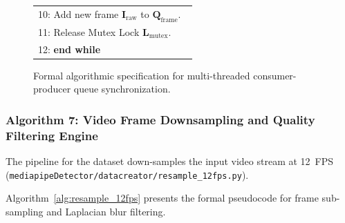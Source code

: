 \begin{figure}[htbp]
\begin{minipage}{0.92\textwidth}
\begin{tabular}{|p{0.96\linewidth}|}
{\small 10: \hspace{1em} Add new frame $\mathbf{I}_{\text{raw}}$ to $\mathbf{Q}_{\text{frame}}$.} \\
{\small 11: \hspace{1em} Release Mutex Lock $\mathbf{L}_{\text{mutex}}$.} \\
{\small 12: \textbf{end while}} \\
\hline
\end{tabular}
\end{minipage}
\caption{Formal algorithmic specification for multi-threaded consumer-producer queue synchronization.}
\label{alg:queue_synchronization}
\end{figure}

\subsubsection{Algorithm 7: Video Frame Downsampling and Quality Filtering Engine}
The pipeline for the dataset down-samples the input video stream at 12~FPS (\texttt{mediapipeDetector/datacreator/resample\_12fps.py}).

Algorithm~\ref{alg:resample_12fps} presents the formal pseudocode for frame sub-sampling and Laplacian blur filtering.


